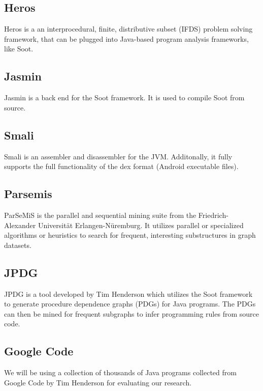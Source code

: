 \documentclass[12pt]{article}
\begin{document}
\subsection{Heros}
Heros is a an interprocedural, finite, distributive subset (IFDS) problem solving framework, that can be plugged into Java-based program analysis frameworks, like Soot.

\subsection{Jasmin}
Jasmin is a back end for the Soot framework. It is used to compile Soot from source.

\subsection{Smali}
Smali is an assembler and disassembler for the JVM. Additonally, it fully supports the full functionality of the dex format (Android executable files).

\subsection{Parsemis}
ParSeMiS is the parallel and sequential mining suite from the Friedrich-Alexander Universit{\"a}t Erlangen-N{\"u}remburg. It utilizes parallel or specialized algorithms or heuristics to search for frequent, interesting substructures in graph datasets.

\subsection{JPDG}
\label{subsection:JPDG}
JPDG is a tool developed by Tim Henderson which utilizes the Soot framework to generate procedure dependence graphs (PDGs) for Java programs. The PDGs can then be mined for frequent subgraphs to infer programming rules from source code.

\subsection{Google Code}
We will be using a collection of thousands of Java programs collected from Google Code by Tim Henderson for evaluating our research.

\pagebreak


\end{document}
